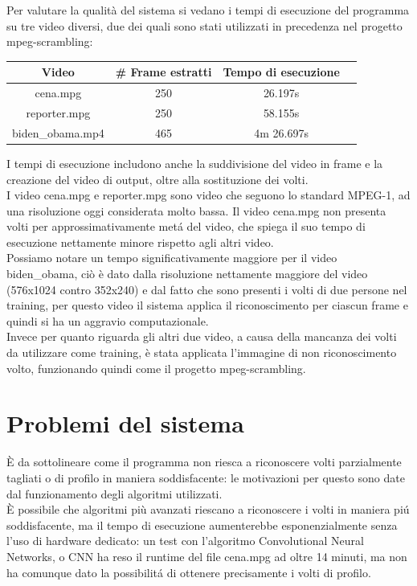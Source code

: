 \documentclass{report}
\begin{document}
Per valutare la qualità del sistema si vedano i tempi di esecuzione del programma su tre video diversi, due dei quali sono stati utilizzati in precedenza nel progetto mpeg-scrambling:

\begin{center}
\begin{tabular}{| c | c | c | c |}
 \hline
 Video & \# Frame estratti & Tempo di esecuzione \\ [0.5ex]
 \hline
 cena.mpg & 250 & 26.197s \\
 \hline
 reporter.mpg & 250 & 58.155s \\
 \hline
 biden\_obama.mp4 & 465 & 4m 26.697s \\
 \hline
\end{tabular}
\end{center}

I tempi di esecuzione includono anche la suddivisione del video in frame e la creazione del video di output, oltre alla sostituzione dei volti. \\
I video cena.mpg e reporter.mpg sono video che seguono lo standard MPEG-1, ad una risoluzione oggi considerata molto bassa. Il video cena.mpg non presenta volti per approssimativamente metá del video, che spiega il suo tempo di esecuzione nettamente minore rispetto agli altri video. \\
Possiamo notare un tempo significativamente maggiore per il video biden\_obama, ciò è dato dalla risoluzione nettamente maggiore del video (576x1024 contro 352x240) e dal fatto che sono presenti i volti di due persone nel training, per questo video il sistema applica il riconoscimento per ciascun frame e quindi si ha un aggravio computazionale. \\
Invece per quanto riguarda gli altri due video, a causa della mancanza dei volti da utilizzare come training, è stata applicata l’immagine di non riconoscimento volto, funzionando quindi come il progetto mpeg-scrambling. \\
\section{Problemi del sistema}
È da sottolineare come il programma non riesca a riconoscere volti parzialmente tagliati o di profilo in maniera soddisfacente: le motivazioni per questo sono date dal funzionamento degli algoritmi utilizzati. \\
È possibile che algoritmi più avanzati riescano a riconoscere i volti in maniera piú soddisfacente, ma il tempo di esecuzione aumenterebbe esponenzialmente senza l’uso di hardware dedicato: un test con l’algoritmo Convolutional Neural Networks, o CNN ha reso il runtime del file cena.mpg ad oltre 14 minuti, ma non ha comunque dato la possibilitá di ottenere precisamente i volti di profilo. \\
\end{document}
